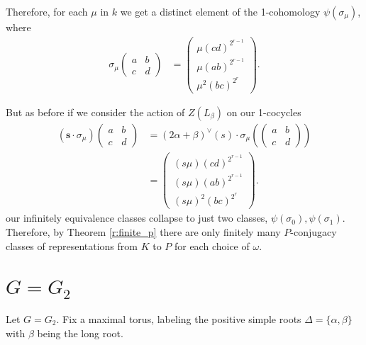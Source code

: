 Therefore, for each $\mu$ in $k$ we get a distinct element of the 1-cohomology $\psi(\sigma_\mu)$, where
\begin{align*}
\sigma_\mu\left(\begin{matrix} a & b \\ c & d \end{matrix}\right) &=
\left(\begin{matrix}  \mu(cd)^{2^{r-1}}  \\ \mu\left(ab \right)^{2^{r-1}} \\ \mu^2\left( bc \right)^{2^r} \end{matrix}\right).
\end{align*}

But as before if we consider the action of $Z(L_\beta)$ on our 1-cocycles
\begin{align*}
(\mathbf{s}\cdot \sigma_\mu)\left(\begin{matrix} a & b \\ c & d \end{matrix}\right) &=
(2\alpha + \beta)^\vee(s) \cdot \sigma_\mu\left(\left(\begin{matrix} a & b \\ c & d \end{matrix}\right)\right)\\
&=
\left(\begin{matrix}  (s\mu)(cd)^{2^{r-1}}  \\ (s\mu)\left(ab \right)^{2^{r-1}} \\ (s\mu)^2\left( bc \right)^{2^r} \end{matrix}\right).
\end{align*}
our infinitely equivalence classes collapse to just two classes, $\psi(\sigma_0), \psi(\sigma_1)$. Therefore, by Theorem \ref{r:finite_p} there are only finitely many $P$-conjugacy classes of representations from $K$ to $P$ for each choice of $\omega$.

	\section{$G = G_2$}
	\label{g2}

	Let $G=G_2$. Fix a maximal torus, labeling the positive simple roots $\Delta=\{\alpha, \beta\}$ with $\beta$ being the long root. 

